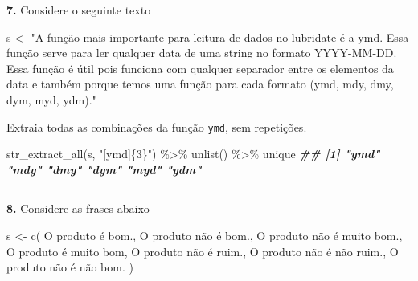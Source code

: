 \documentclass[
]{book}
\newenvironment{Shaded}{\begin{snugshade}}{\end{snugshade}}
\newcommand{\DocumentationTok}[1]{\textcolor[rgb]{0.56,0.35,0.01}{\textbf{\textit{#1}}}}
\newcommand{\FunctionTok}[1]{\textcolor[rgb]{0.00,0.00,0.00}{#1}}
\newcommand{\NormalTok}[1]{#1}
\newcommand{\OtherTok}[1]{\textcolor[rgb]{0.56,0.35,0.01}{#1}}
\newcommand{\SpecialCharTok}[1]{\textcolor[rgb]{0.00,0.00,0.00}{#1}}
\newcommand{\StringTok}[1]{\textcolor[rgb]{0.31,0.60,0.02}{#1}}
\begin{document}
\textbf{7.} Considere o seguinte texto

\begin{Shaded}
\begin{Highlighting}[]
\NormalTok{s }\OtherTok{\textless{}{-}} \StringTok{"A função mais importante para leitura de dados no \textasciigrave{}lubridate\textasciigrave{} é a \textasciigrave{}ymd\textasciigrave{}. Essa função serve para ler qualquer data de uma \textasciigrave{}string\textasciigrave{} no formato \textasciigrave{}YYYY{-}MM{-}DD\textasciigrave{}. Essa função é útil pois funciona com qualquer separador entre os elementos da data e também porque temos uma função para cada formato (\textasciigrave{}ymd\textasciigrave{}, \textasciigrave{}mdy\textasciigrave{}, \textasciigrave{}dmy\textasciigrave{}, \textasciigrave{}dym\textasciigrave{}, \textasciigrave{}myd\textasciigrave{}, \textasciigrave{}ydm\textasciigrave{})."}
\end{Highlighting}
\end{Shaded}

Extraia todas as combinações da função \texttt{ymd}, sem repetições.

\begin{Shaded}
\begin{Highlighting}[]
\FunctionTok{str\_extract\_all}\NormalTok{(s, }\StringTok{"[ymd]\{3\}"}\NormalTok{) }\SpecialCharTok{\%\textgreater{}\%} 
  \FunctionTok{unlist}\NormalTok{() }\SpecialCharTok{\%\textgreater{}\%} 
\NormalTok{  unique}
\DocumentationTok{\#\# [1] "ymd" "mdy" "dmy" "dym" "myd" "ydm"}
\end{Highlighting}
\end{Shaded}

\begin{center}\rule{0.5\linewidth}{0.5pt}\end{center}

\textbf{8.} Considere as frases abaixo

\begin{Shaded}
\begin{Highlighting}[]
\NormalTok{s }\OtherTok{\textless{}{-}} \FunctionTok{c}\NormalTok{(}
  \StringTok{\textquotesingle{}O produto é bom.\textquotesingle{}}\NormalTok{,}
  \StringTok{\textquotesingle{}O produto não é bom.\textquotesingle{}}\NormalTok{,}
  \StringTok{\textquotesingle{}O produto não é muito bom.\textquotesingle{}}\NormalTok{,}
  \StringTok{\textquotesingle{}O produto é muito bom\textquotesingle{}}\NormalTok{,}
  \StringTok{\textquotesingle{}O produto não é ruim.\textquotesingle{}}\NormalTok{,}
  \StringTok{\textquotesingle{}O produto não é não ruim.\textquotesingle{}}\NormalTok{,}
  \StringTok{\textquotesingle{}O produto não é não bom.\textquotesingle{}}
\NormalTok{)}
\end{Highlighting}
\end{Shaded}
\end{document}
